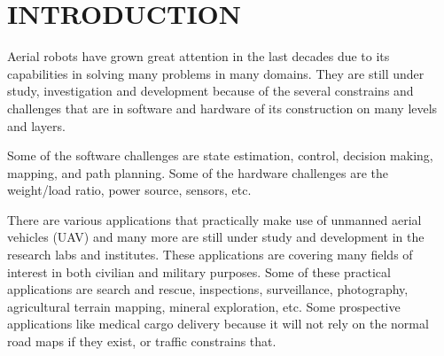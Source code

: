 





\section{INTRODUCTION}

Aerial robots have grown great attention in the last decades due to its capabilities in solving many problems in many domains. They are still under study, investigation and development because of the several constrains and challenges that are in software and hardware of its construction on  many levels and layers. 

Some of the software challenges are state estimation, control, decision making, mapping, and path planning. Some of the hardware challenges are the weight/load ratio, power source, sensors, etc. 

There are various applications that practically make use of unmanned aerial vehicles (UAV) and many more are still under study and development in the research labs and institutes. These applications are covering many fields of interest in both civilian and military purposes. Some of these practical applications are search and rescue, inspections, surveillance, photography, agricultural terrain mapping, mineral exploration, etc. Some prospective applications like medical cargo delivery because it will not rely on the normal road maps if they exist, or traffic constrains that.

